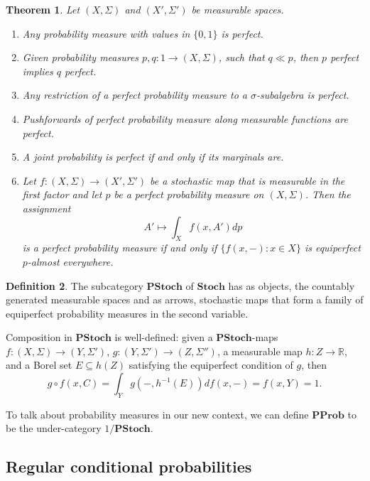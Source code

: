 \documentclass[11pt]{amsart}
\newcommand{\RR}{\mathbb{R}}
\newcommand{\cat}[1]{\mathbf{#1}}
\newcommand{\from}{\colon}
\newtheorem{thm}{Theorem}[section]
\theoremstyle{remark}
\theoremstyle{definition}
\newtheorem{defn}[thm]{Definition}
\begin{document}
\begin{thm} \label{Thm.Perfect Prob Measure Facts}
	Let $(X,\Sigma)$ and $(X',\Sigma')$ be measurable spaces.
	\begin{enumerate}
		\item Any probability measure with values in $\{0,1\}$ is perfect. \label{thm.perfect prob fact deterministic is perfect}
		\item Given probability measures $p,q \from 1 \to (X,\Sigma)$, such that $q \ll p$, then $p$ perfect implies $q$ perfect.
		\item  Any restriction of a perfect probability measure to a $\sigma$-subalgebra is perfect.
		\item Pushforwards of perfect probability measure along measurable functions are perfect.
		\item A joint probability is perfect if and only if its marginals are.
		\item Let $f \from (X,\Sigma) \to (X',\Sigma')$ be a stochastic map that is measurable in the first factor and let $p$ be a perfect probability measure on $(X,\Sigma)$. Then the assignment
		\[
			A' \mapsto \int_X f(x,A')dp
		\] 
		is a perfect probability measure if and only if $\{f(x,-) : x \in X\}$ is equiperfect $p$-almost everywhere. \label{thm.perfect prob fact composition}
	\end{enumerate}
\end{thm}

\begin{defn}
	The subcategory $\cat{PStoch}$ of $\cat{Stoch}$ has as objects, the countably generated measurable spaces and as arrows, stochastic maps that form a family of equiperfect probability measures in the second variable. 
\end{defn}

Composition in $\cat{PStoch}$ is well-defined: given a $\cat{PStoch}$-maps $f \from (X,\Sigma) \to (Y,\Sigma')$, $g \from (Y,\Sigma') \to (Z,\Sigma'')$, a measurable map $h \from Z \to \RR$, and a Borel set $E \subseteq h(Z)$ satisfying the equiperfect condition of $g$, then 
\[
	g \circ f (x,C) = \int_Y g(-,h^{-1}(E))df(x,-) = f(x,Y) = 1.
\]

To talk about probability measures in our new 
context, we can define 
$\cat{PProb}$ to be the under-category 
$1/\cat{PStoch}$.

\subsection{Regular conditional probabilities}
 
\end{document}

